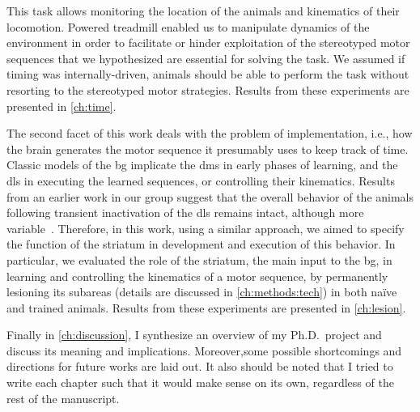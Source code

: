 This task allows monitoring the location of the animals and kinematics of their locomotion.
Powered treadmill enabled us to manipulate dynamics of the environment in order to facilitate or hinder exploitation of the stereotyped motor sequences that we hypothesized are essential for solving the task.
We assumed if timing was internally-driven, animals should be able to perform the task without resorting to the stereotyped motor strategies.
Results from these experiments are presented in \autoref{ch:time}.
\par
The second facet of this work deals with the problem of implementation, i.e., how the brain generates the motor 
sequence it presumably uses to keep track of time.
Classic models of the \gls{bg} implicate the \gls{dms} in early phases of learning, and the \gls{dls} in executing the learned sequences, or controlling their kinematics.
Results from an earlier work in our group suggest that the overall behavior of the animals following transient inactivation of the \gls{dls} remains intact, although more variable~\cite{Rueda2015NN}.
Therefore, in this work, using a similar approach, we aimed to specify the function of the striatum in development and execution of this behavior.
In particular, we evaluated the role of the striatum, the main input to the \gls{bg}, in learning and controlling the kinematics of a motor sequence, by permanently lesioning its subareas (details are discussed in \autoref{ch:methods:tech}) in both na\"{i}ve and trained animals.
Results from these experiments are presented in \autoref{ch:lesion}.
\par
Finally in \autoref{ch:discussion}, I synthesize an overview of my Ph.D.\ project and discuss its meaning and implications.
Moreover,some possible shortcomings and directions for future works are laid out.
It also should be noted that I tried to write each chapter such that it would make sense on its own, regardless of the rest of the manuscript.